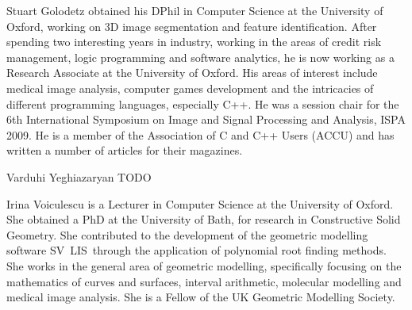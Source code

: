\documentclass[10pt,twocolumn,twoside]{IEEEtran}
\newcommand{\svlis}{%
\mbox{\scriptsize S\hspace{-0.2mm}\footnotesize V\hspace{-0.2mm}%
\normalsize L\hspace{0.1mm}\footnotesize I\hspace{0.2mm}\scriptsize S\ }}
\begin{document}
\begin{IEEEbiography}{Stuart Golodetz}
obtained his DPhil in Computer Science at the University of Oxford, working on 3D image segmentation and feature identification. After spending two interesting years in industry, working in the areas of credit risk management, logic programming and software analytics, he is now working as a Research Associate at the University of Oxford. His areas of interest include medical image analysis, computer games development and the intricacies of different programming languages, especially C++. He was a session chair for the 6th International Symposium on Image and Signal Processing and Analysis, ISPA 2009. He is a member of the Association of C and C++ Users (ACCU) and has written a number of articles for their magazines.
\end{IEEEbiography}

\begin{IEEEbiography}[]{Varduhi Yeghiazaryan}
TODO
\end{IEEEbiography}

\begin{IEEEbiography}{Irina Voiculescu}
is a Lecturer in Computer Science at the University of Oxford. She obtained a PhD at the University of Bath, for research in Constructive Solid Geometry. She contributed to the development of the geometric modelling software \svlis through the application of polynomial root finding methods. She works in the general area of geometric modelling, specifically focusing on the mathematics of curves and surfaces, interval arithmetic, molecular modelling and medical image analysis. She is a Fellow of the UK Geometric Modelling Society.
\end{IEEEbiography}
\end{document}
